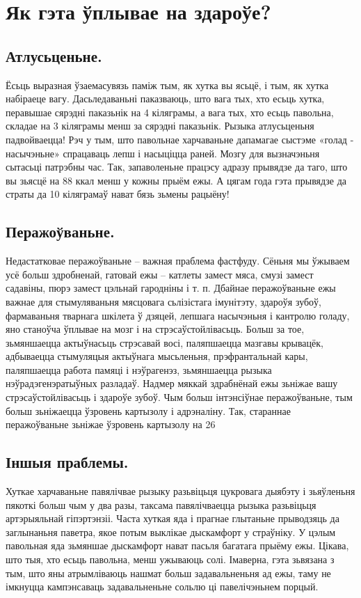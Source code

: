 \section{Як гэта ўплывае на здароўе?}

\subsection{Атлусьценьне.}
Ёсьць выразная ўзаемасувязь паміж тым, як хутка вы ясьцё, і тым, як хутка набіраеце вагу. Дасьледаваньні паказваюць, што вага тых, хто есьць хутка, перавышае сярэдні паказьнік на 4 кіляграмы, а вага тых, хто есьць павольна, складае на 3 кіляграмы менш за сярэдні паказьнік. Рызыка атлусьценьня падвойваецца! Рэч у тым, што павольнае харчаваньне дапамагае сыстэме «голад - насычэньне» спрацаваць лепш і насыціцца раней. Мозгу для вызначэньня сытасьці патрэбны час. Так, запаволеньне працэсу адразу прывядзе да таго, што вы зьясцё на 88 ккал менш у кожны прыём ежы. А цягам года гэта прывядзе да страты да 10 кіляграмаў нават бязь зьмены рацыёну!

\subsection{Перажоўваньне.}
Недастатковае перажоўваньне – важная праблема фастфуду. Сёньня мы ўжываем усё больш здробненай, гатовай ежы – катлеты замест мяса, смузі замест садавіны, пюрэ замест цэльнай гародніны і т. п. Дбайнае перажоўваньне ежы важнае для стымуляваньня мясцовага сьлізістага імунітэту, здароўя зубоў, фармаваньня тварнага шкілета ў дзяцей, лепшага насычэньня і кантролю голаду, яно станоўча ўплывае на мозг і на стрэсаўстойлівасьць. Больш за тое, зьмяншаецца актыўнасьць стрэсавай восі, паляпшаецца мазгавы крывацёк, адбываецца стымуляцыя актыўнага мысьленьня, прэфрантальнай кары, паляпшаецца работа памяці і нэўрагенэз, зьмяншаецца рызыка нэўрадэгенэратыўных разладаў. Надмер мяккай здрабнёнай ежы зьніжае вашу стрэсаўстойлівасьць і здароўе зубоў. Чым больш інтэнсіўнае перажоўваньне, тым больш зьніжаецца ўзровень картызолу і адрэналіну. Так, стараннае перажоўваньне зьніжае ўзровень картызолу на 26%

\subsection{Іншыя праблемы.}
Хуткае харчаваньне павялічвае рызыку разьвіцьця цукровага дыябэту і зьяўленьня пякоткі больш чым у два разы, таксама павялічваецца рызыка разьвіцьця артэрыяльнай гіпэртэнзіі. Часта хуткая яда і прагнае глытаньне прыводзяць да заглынаньня паветра, якое потым выклікае дыскамфорт у страўніку. У цэлым павольная яда зьмяншае дыскамфорт нават пасьля багатага прыёму ежы. Цікава, што тыя, хто есьць павольна, менш ужываюць солі. Імаверна, гэта зьвязана з тым, што яны атрымліваюць нашмат больш задавальненьня ад ежы, таму не імкнуцца кампэнсаваць задавальненьне сольлю ці павелічэньнем порцый.

